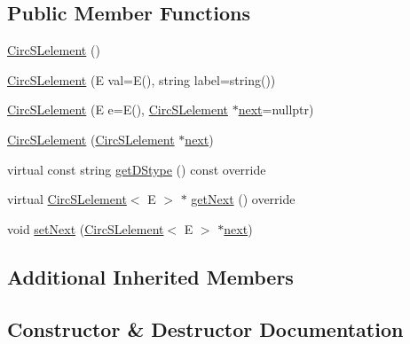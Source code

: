 \subsection*{Public Member Functions}
\begin{DoxyCompactItemize}
\item 
\hyperlink{classbridges_1_1datastructure_1_1_circ_s_lelement_a3c79c117602d95cb150517b38442652e}{Circ\+S\+Lelement} ()
\item 
\hyperlink{classbridges_1_1datastructure_1_1_circ_s_lelement_a77f564922261b58522ddb244a8cea0dc}{Circ\+S\+Lelement} (E val=E(), string label=string())
\item 
\hyperlink{classbridges_1_1datastructure_1_1_circ_s_lelement_aaedaa1d980bd5a66511b57cd20a8d94c}{Circ\+S\+Lelement} (E e=E(), \hyperlink{classbridges_1_1datastructure_1_1_circ_s_lelement}{Circ\+S\+Lelement} $\ast$\hyperlink{classbridges_1_1datastructure_1_1_s_lelement_afc016a593a4a5aba82021ee34edadbfc}{next}=nullptr)
\item 
\hyperlink{classbridges_1_1datastructure_1_1_circ_s_lelement_a89f06ba76b1fdf1d2343c5f18f226722}{Circ\+S\+Lelement} (\hyperlink{classbridges_1_1datastructure_1_1_circ_s_lelement}{Circ\+S\+Lelement} $\ast$\hyperlink{classbridges_1_1datastructure_1_1_s_lelement_afc016a593a4a5aba82021ee34edadbfc}{next})
\item 
virtual const string \hyperlink{classbridges_1_1datastructure_1_1_circ_s_lelement_a775ba08a7811fe91c396cb27ba9343ab}{get\+D\+Stype} () const override
\item 
virtual \hyperlink{classbridges_1_1datastructure_1_1_circ_s_lelement}{Circ\+S\+Lelement}$<$ E $>$ $\ast$ \hyperlink{classbridges_1_1datastructure_1_1_circ_s_lelement_aff77056ace1361a35a09dc006eba34a3}{get\+Next} () override
\item 
void \hyperlink{classbridges_1_1datastructure_1_1_circ_s_lelement_a623d302217fce43a444e6da5e1de9b40}{set\+Next} (\hyperlink{classbridges_1_1datastructure_1_1_circ_s_lelement}{Circ\+S\+Lelement}$<$ E $>$ $\ast$\hyperlink{classbridges_1_1datastructure_1_1_s_lelement_afc016a593a4a5aba82021ee34edadbfc}{next})
\end{DoxyCompactItemize}
\subsection*{Additional Inherited Members}


\subsection{Constructor \& Destructor Documentation}
\mbox{\label{classbridges_1_1datastructure_1_1_circ_s_lelement_a3c79c117602d95cb150517b38442652e}} 
